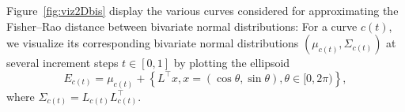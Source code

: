 \documentclass[entropy,article,accept,oneauthor,pdftex,entropy]{Definitions/mdpi}
\def\calM{\mathcal{M}}
\def\CO{\mathrm{CO}}
\def\calN{\mathcal{N}}
\begin{document}
Figure~\ref{fig:viz2Dbis} display the various curves considered for approximating the Fisher–Rao distance between bivariate normal distributions: For a curve $c(t)$, we visualize its corresponding bivariate normal distributions $(\mu_{c(t)},\Sigma_{c(t)})$ at several increment steps $t\in [0,1]$ by plotting the ellipsoid 
$$
E_{c(t)}=\mu_{c(t)}+\left\{L^\top x, x=(\cos\theta,\sin\theta), \theta\in [0,2\pi)\right\},
$$
where $\Sigma_{c(t)}=L_{c(t)}L^\top_{c(t)}$.


\end{document}
